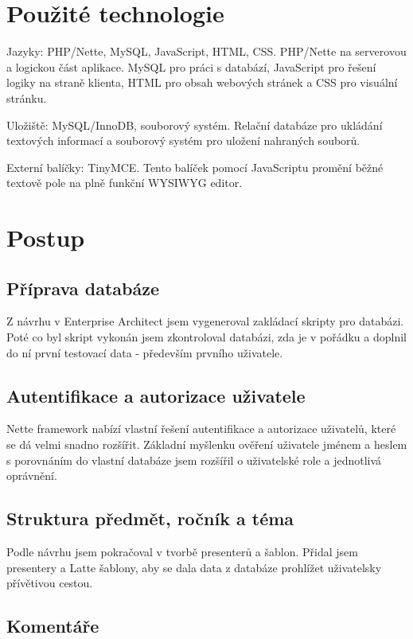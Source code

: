 \documentclass[thesis=B,czech]{FITthesis}[2012/06/26]
\begin{document}
\section{Použité technologie}

Jazyky: PHP/Nette, MySQL, JavaScript, HTML, CSS. PHP/Nette na serverovou a logickou část aplikace. MySQL pro práci s databází, JavaScript pro řešení logiky na straně klienta, HTML pro obsah webových stránek a CSS pro visuální stránku.

Uložiště: MySQL/InnoDB, souborový systém. Relační databáze pro ukládání textových informací a souborový systém pro uložení nahraných souborů.

Externí balíčky: TinyMCE. Tento balíček pomocí JavaScriptu promění běžné textově pole na plně funkční WYSIWYG editor.

\section{Postup}

\subsection{Příprava databáze}

Z návrhu v Enterprise Architect jsem vygeneroval zakládací skripty pro databázi. Poté co byl skript vykonán jsem zkontroloval databázi, zda je v pořádku a doplnil do ní první testovací data - především prvního uživatele.

\subsection{Autentifikace a autorizace uživatele}

Nette framework nabízí vlastní řešení autentifikace a autorizace uživatelů, které se dá velmi snadno rozšířit. Základní myšlenku ověření uživatele jménem a heslem s porovnáním do vlastní databáze jsem rozšířil o uživatelské role a jednotlivá oprávnění.

\subsection{Struktura předmět, ročník a téma}

Podle návrhu jsem pokračoval v tvorbě presenterů a šablon. Přidal jsem presentery a Latte šablony, aby se dala data z databáze prohlížet uživatelsky přívětivou cestou.

\subsection{Komentáře}
\end{document}

